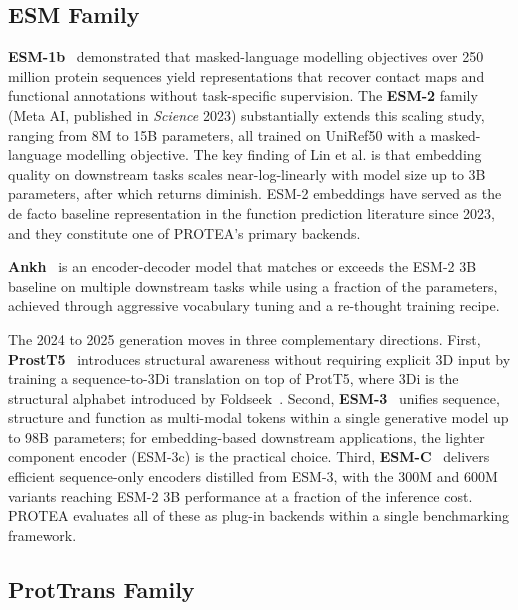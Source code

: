 \subsection{ESM Family}
\label{subsec:related-esm}

\textbf{ESM-1b}~\cite{rives2021esm1b} demonstrated that masked-language
modelling objectives over 250 million protein sequences yield representations that
recover contact maps and functional annotations without task-specific supervision.
The \textbf{ESM-2} family~\cite{lin2023esm2} (Meta AI, published in
\textit{Science} 2023) substantially extends this scaling study, ranging from 8M
to 15B parameters, all trained on UniRef50 with a masked-language modelling
objective. The key finding of Lin et al. is that embedding quality on downstream
tasks scales near-log-linearly with model size up to 3B parameters, after which
returns diminish. ESM-2 embeddings have served as the de facto baseline
representation in the function prediction literature since 2023, and they
constitute one of PROTEA's primary backends.

\textbf{Ankh}~\cite{elnaggar2023ankh} is an encoder-decoder model that
matches or exceeds the ESM-2 3B baseline on multiple downstream tasks while
using a fraction of the parameters, achieved through aggressive vocabulary
tuning and a re-thought training recipe.

The 2024 to 2025 generation moves in three complementary directions. First,
\textbf{ProstT5}~\cite{heinzinger2023prostt5} introduces structural awareness
without requiring explicit 3D input by training a sequence-to-3Di translation
on top of ProtT5, where 3Di is the structural alphabet introduced by
Foldseek~\cite{vankempen2024foldseek}. Second, \textbf{ESM-3}~\cite{hayes2024esm3}
unifies sequence, structure and function as multi-modal tokens within a single
generative model up to 98B parameters; for embedding-based downstream
applications, the lighter component encoder (ESM-3c) is the practical choice.
Third, \textbf{ESM-C}~\cite{esm2024esmc} delivers efficient sequence-only
encoders distilled from ESM-3, with the 300M and 600M variants reaching
ESM-2 3B performance at a fraction of the inference cost. PROTEA evaluates all
of these as plug-in backends within a single benchmarking framework.

\subsection{ProtTrans Family}
\label{subsec:related-prottrans}

